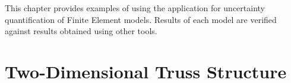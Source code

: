 This chapter provides examples of using the \texttt{\getsoftwarename{}} application for uncertainty
quantification of Finite Element models. Results of each model are verified against results
obtained using other tools. 
\\

\section{Two-Dimensional Truss Structure}



